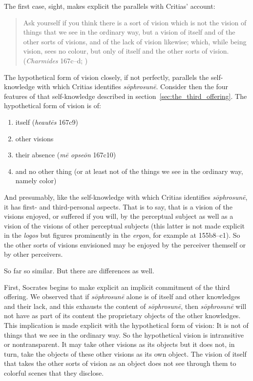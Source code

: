 The first case, sight, makes explicit the parallels with Critias' account:
\begin{quote}
	Ask yourself if you think there is a sort of vision which is not the vision of things that we see in the ordinary way, but a vision of itself and of the other sorts of visions, and of the lack of vision likewise; which, while being vision, sees no colour, but only of itself and the other sorts of vision. (\emph{Charmides} 167c–d; \citealt[59]{Lamb:1927qw})
\end{quote}
The hypothetical form of vision closely, if not perfectly, parallels the self-knowledge with which Critias identifies \emph{sōphrosunē}. Consider then the four features of that self-knowledge described in section~\ref{sec:the_third_offering}. The hypothetical form of vision is of:
\begin{enumerate}[(1)]
	\item itself (\emph{heautēs} 167c9)
	\item other visions
	\item their absence (\emph{mē opseōn} 167c10)
	\item and no other thing (or at least not of the things we see in the ordinary way, namely color)
\end{enumerate}
And presumably, like the self-knowledge with which Critias identifies \emph{sōphrosunē}, it has first- and third-personal aspects. That is to say, that is a vision of the visions enjoyed, or suffered if you will, by the perceptual subject as well as a vision of the visions of other perceptual subjects (this latter is not made explicit in the \emph{logos} but figures prominently in the \emph{ergon}, for example at 155b8–c1). So the other sorts of visions envisioned may be enjoyed by the perceiver themself or by other perceivers. 

So far so similar. But there are differences as well.

First, Socrates begins to make explicit an implicit commitment of the third offering. We observed that if \emph{sōphrosunē} alone is of itself and other knowledges and their lack, and this exhausts the content of \emph{sōphrosunē}, then \emph{sōphrosunē} will not have as part of its content the proprietary objects of the other knowledges. This implication is made explicit with the hypothetical form of vision: It is not of things that we see in the ordinary way. So the hypothetical vision is intransitive or nontransparent. It may take other visions as its objects but it does not, in turn, take the objects of these other visions as its own object. The vision of itself that takes the other sorts of vision as an object does not see through them to colorful scenes that they disclose.

